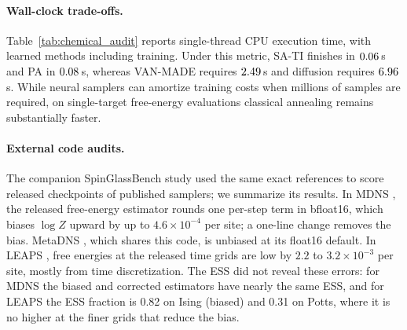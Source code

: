 \paragraph{Wall-clock trade-offs.} Table~\ref{tab:chemical_audit} reports single-thread CPU execution time, with learned methods including training. Under this metric, SA-TI finishes in $0.06$\,s and PA in $0.08$\,s, whereas VAN-MADE requires $2.49$\,s and diffusion requires $6.96$\,s. While neural samplers can amortize training costs when millions of samples are required, on single-target free-energy evaluations classical annealing remains substantially faster.

\paragraph{External code audits.} The companion SpinGlassBench study used the same exact references to score released checkpoints of published samplers; we summarize its results. In MDNS \citep{zhu2025mdns}, the released free-energy estimator rounds one per-step term in bfloat16, which biases $\log Z$ upward by up to $4.6\times10^{-4}$ per site; a one-line change removes the bias. MetaDNS \citep{du2026metadns}, which shares this code, is unbiased at its float16 default. In LEAPS \citep{holderrieth2025leaps}, free energies at the released time grids are low by $2.2$ to $3.2\times10^{-3}$ per site, mostly from time discretization. The ESS did not reveal these errors: for MDNS the biased and corrected estimators have nearly the same ESS, and for LEAPS the ESS fraction is 0.82 on Ising (biased) and 0.31 on Potts, where it is no higher at the finer grids that reduce the bias.
